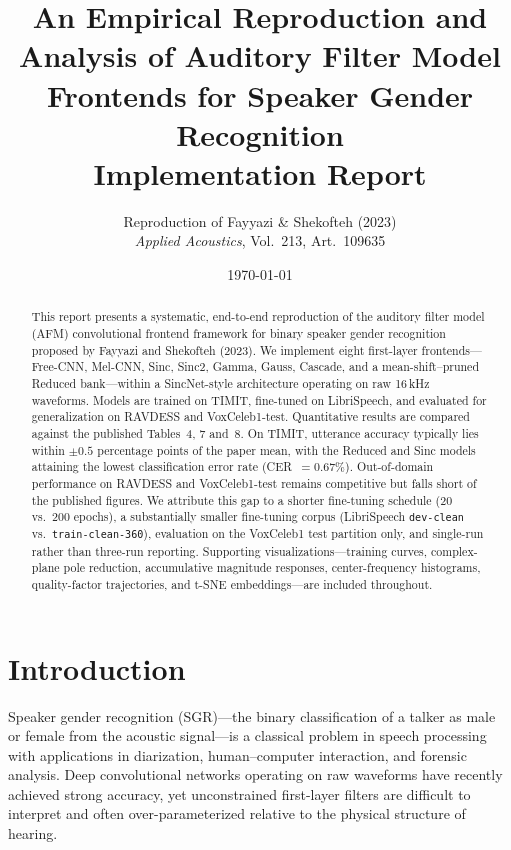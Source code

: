 \documentclass[11pt,a4paper]{article}
\title{
\vspace{-1.2em}
\textbf{An Empirical Reproduction and Analysis of Auditory Filter Model Frontends for Speaker Gender Recognition}\\[0.6em]
\large Implementation Report
}
\author{
  Reproduction of Fayyazi \& Shekofteh (2023)\\[0.3em]
  \normalsize\textit{Applied Acoustics}, Vol.~213, Art.~109635
}
\date{\today}
\begin{document}
\maketitle

\begin{abstract}
\noindent
This report presents a systematic, end-to-end reproduction of the auditory filter model (AFM) convolutional frontend framework for binary speaker gender recognition proposed by Fayyazi and Shekofteh (2023). We implement eight first-layer frontends---Free-CNN, Mel-CNN, Sinc, Sinc2, Gamma, Gauss, Cascade, and a mean-shift--pruned Reduced bank---within a SincNet-style architecture operating on raw 16\,kHz waveforms. Models are trained on TIMIT, fine-tuned on LibriSpeech, and evaluated for generalization on RAVDESS and VoxCeleb1-test. Quantitative results are compared against the published Tables~4, 7 and~8. On TIMIT, utterance accuracy typically lies within $\pm 0.5$ percentage points of the paper mean, with the Reduced and Sinc models attaining the lowest classification error rate (CER~$=0.67\%$). Out-of-domain performance on RAVDESS and VoxCeleb1-test remains competitive but falls short of the published figures. We attribute this gap to a shorter fine-tuning schedule (20 vs.\ 200 epochs), a substantially smaller fine-tuning corpus (LibriSpeech \texttt{dev-clean} vs.\ \texttt{train-clean-360}), evaluation on the VoxCeleb1 test partition only, and single-run rather than three-run reporting. Supporting visualizations---training curves, complex-plane pole reduction, accumulative magnitude responses, center-frequency histograms, quality-factor trajectories, and t-SNE embeddings---are included throughout.
\end{abstract}

\tableofcontents
\newpage

\section{Introduction}

Speaker gender recognition (SGR)---the binary classification of a talker as male or female from the acoustic signal---is a classical problem in speech processing with applications in diarization, human--computer interaction, and forensic analysis. Deep convolutional networks operating on raw waveforms have recently achieved strong accuracy, yet unconstrained first-layer filters are difficult to interpret and often over-parameterized relative to the physical structure of hearing.
\end{document}
